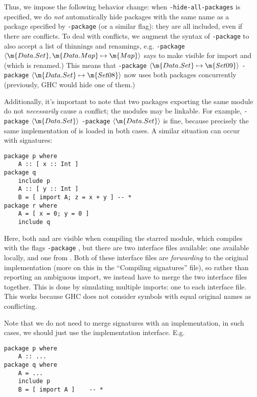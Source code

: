 \documentclass{article}
\begin{document}
Thus, we impose the following behavior change: when
\texttt{-hide-all-packages} is specified, we do \emph{not} automatically
hide packages with the same name as a package specified by
\texttt{-package} (or a similar flag): they are all included, even if
there are conflicts.  To deal with conflicts, we augment the syntax of
\texttt{-package} to also accept a list of thinnings and renamings, e.g.
\texttt{-package}  $\langle\m{Data.Set},
\m{Data.Map}\mapsto \m{Map}\rangle$ says to make visible for import
 and  (which is  renamed.)  This means
that
\texttt{-package}  $\langle\m{Data.Set}\mapsto
\m{Set09}\rangle$ \texttt{-package} 
$\langle\m{Data.Set}\mapsto \m{Set08}\rangle$ now uses both packages
concurrently (previously, GHC would hide one of them.)

Additionally, it's important to note that two packages exporting the
same module do not \emph{necessarily} cause a conflict; the modules
may be linkable.  For example, \texttt{-package}  $\langle\m{Data.Set}\rangle$
\texttt{-package}  $\langle\m{Data.Set}\rangle$ is fine, because
precisely the same implementation of  is loaded in both cases.
A similar situation can occur with signatures:

\begin{verbatim}
package p where
    A :: [ x :: Int ]
package q
    include p
    A :: [ y :: Int ]
    B = [ import A; z = x + y ] -- *
package r where
    A = [ x = 0; y = 0 ]
    include q
\end{verbatim}

Here, both  and  are visible when compiling the starred
module, which compiles with the flags \texttt{-package} , but there
are two interface files available: one available locally, and one from .
Both of these interface files are \emph{forwarding} to the original implementation
 (more on this in the ``Compiling signatures'' file), so rather than
reporting an ambiguous import, we instead have to merge the two interface files
together. This is done by simulating multiple imports: one to each interface
file. This works because GHC does not consider symbols with equal original names
as conflicting.

Note that we do not need to merge signatures with an implementation, in such
cases, we should just use the implementation interface.  E.g.

\begin{verbatim}
package p where
    A :: ...
package q where
    A = ...
    include p
    B = [ import A ]    -- *
\end{verbatim}
\end{document}
